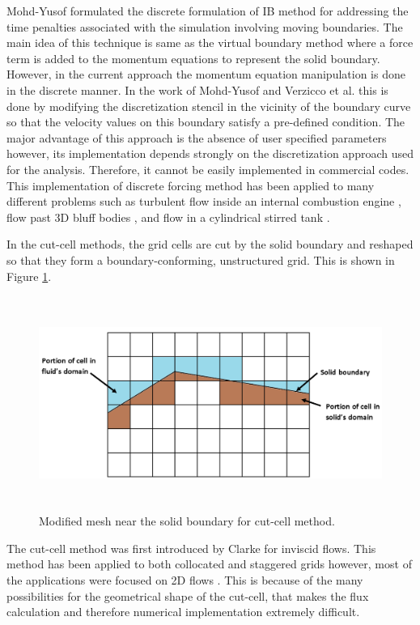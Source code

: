 Mohd-Yusof formulated the discrete formulation of IB method \cite{mohd1997combined} for addressing the time penalties associated with the simulation involving moving boundaries. The main idea of this technique is same as the virtual boundary method where a force term is added to the momentum equations to represent the solid boundary. However, in the current approach the momentum equation manipulation is done in the discrete manner. In the work of Mohd-Yusof \cite{mohd1997combined} and Verzicco et al. \cite{verzicco1998complex} this is done by modifying the discretization stencil in the vicinity of the boundary curve so that the velocity values on this boundary satisfy a pre-defined condition. The major advantage of this approach is the absence of user specified parameters however, its implementation depends strongly on the discretization approach used for the analysis. Therefore, it cannot be easily implemented in commercial codes. This implementation of discrete forcing method has been applied to many different problems such as turbulent flow inside an internal combustion engine \cite{verzicco1998complex}, flow past 3D bluff bodies \cite{verzicco2002large}, and flow in a cylindrical stirred tank \cite{iaccarino2003immersed}.

In the cut-cell methods, the grid cells are cut by the solid boundary and reshaped so that they form a boundary-conforming, unstructured grid. This is shown in Figure \ref{fig:C1_cutCellMesh}.

\begin{figure}[H]
	\centering
	\includegraphics[height=7.0cm]{Chapter_1/figure/cut_cell_mesh}
	\caption{Modified mesh near the solid boundary for cut-cell method.}
	\label{fig:C1_cutCellMesh}
\end{figure}

The cut-cell method was first introduced by Clarke \cite{clarke1986euler} for inviscid flows. This method has been applied to both collocated and staggered grids \cite{kirkpatrick2003representation} however, most of the applications were focused on 2D flows \cite{hu2006conservative, udaykumar1999computation}. This is because of the many possibilities for the geometrical shape of the cut-cell, that makes the flux calculation and therefore numerical implementation extremely difficult.

